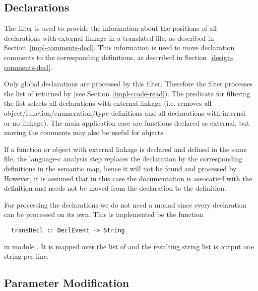 \subsection{Declarations}
\label{impl-ccomps-decls}

The filter  is used to provide the information about the positions of all declarations with
external linkage in
a translated file, as described in Section~\ref{impl-comments-decl}. This information is used to move declaration
comments to the corresponding definitions, as described in Section~\ref{design-comments-decl}.

Only global declarations are processed by this filter. Therefore the filter processes the list of 
returned by  (see Section~\ref{impl-ccode-read}). The predicate for filtering the list
selects all declarations with external linkage (i.e. removes all object/function/enumeration/type definitions and 
all declarations with internal or no linkage). 
The main application case are functions declared as external, but moving the comments may also be useful for 
objects.

If a function or object with external linkage is declared and defined in the same file, the language-c analysis step
replaces the declaration by the corresponding definitions in the semantic map, hence it will not be found and processed
by . However, it is assumed that in this case the documentation is assocatied with the definition
and needs not be moved from the declaration to the definition.

For processing the declarations we do not need a monad since every declaration can be processed on its own. This is implemented
be the function
\begin{verbatim}
  transDecl :: DeclEvent -> String
\end{verbatim}
in module . It is mapped over the list of  and the resulting string list
is output one string per line.

\subsection{Parameter Modification}
\label{impl-ccomps-parmod}

\subsubsection{}

